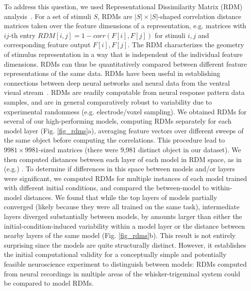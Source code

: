 To address this question, we used Representational Dissimilarity Matrix (RDM) analysis~\cite{Kriegeskorte2008}.
For a set of stimuli $S$, RDMs are $|S| \times |S|$-shaped correlation distance matrices taken over the feature dimensions of a representation, e.g. matrices with $ij$-th entry $RDM[i, j] = 1 - corr(F[i], F[j])$ for stimuli $i, j$ and corresponding feature output $F[i], F[j]$.
The RDM characterizes the geometry of stimulus representation in a way that is independent of the individual feature dimensions.  RDMs can thus be quantitatively compared between different feature representations of the same data.
RDMs have been useful in establishing connections between deep neural networks and neural data from the ventral visual stream~\cite{cadieu2014deep, Yamins2014, khaligh2014deep}. 
RDMs are readily computable from neural response pattern data samples, and are in general comparatively robust to variability due to experimental randomness (e.g. electrode/voxel sampling).
We obtained RDMs for several of our high-performing models, computing RDMs separately for each model layer (Fig. \ref{fig_rdms}a), averaging feature vectors over different sweeps of the same object before computing the correlations.
This procedure lead to $9981\times9981$-sized matrices (there were 9,981 distinct object in our dataset).
We then computed distances between each layer of each model in RDM space, as in (e.g.) \cite{khaligh2014deep}.
To determine if differences in this space between models and/or layers were significant, we computed RDMs for multiple instances of each model trained with different initial conditions, and compared the between-model to within-model distances.
We found that while the top layers of models partially converged (likely because they were all trained on the same task), intermediate layers diverged substantially between models, by amounts larger than either the initial-condition-induced variability within a model layer or the distance between nearby layers of the same model (Fig. \ref{fig_rdms}b).
This result is not entirely surprising since the models are quite structurally distinct.  
However, it establishes the initial computational validity for a conceptually simple and potentially feasible neuroscience experiment to distinguish between models: RDMs computed from neural recordings in multiple areas of the whisker-trigeminal system could be compared to model RDMs.


